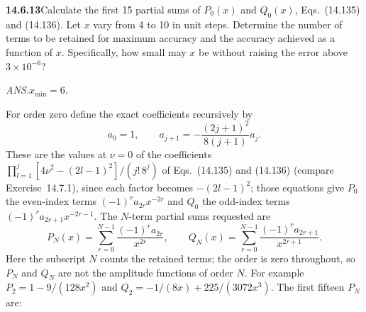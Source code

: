\par\bigskip
\noindent\textbf{14.6.13}\quad Calculate the first 15 partial sums of
$P_{0}(x)$ and $Q_{0}(x)$, Eqs.~(14.135) and (14.136). Let $x$ vary
from 4 to 10 in unit steps. Determine the number of terms to be
retained for maximum accuracy and the accuracy achieved as a function
of $x$. Specifically, how small may $x$ be without raising the error
above $3\times10^{-6}$?
\par\nobreak\hfill\emph{ANS.}\enspace$x_{\min}=6$.
\par{}
\solution
For order zero define the exact coefficients recursively by
\[
a_0=1,\qquad a_{j+1}=-\frac{(2j+1)^2}{8(j+1)}a_j.
\]
These are the values at $\nu=0$ of the coefficients
$\prod_{l=1}^j[4\nu^2-(2l-1)^2]/(j!\,8^j)$ of Eqs.~(14.135) and
(14.136) (compare Exercise~14.7.1), since each factor becomes
$-(2l-1)^2$; those equations give $P_0$ the even-index terms
$(-1)^ra_{2r}x^{-2r}$ and $Q_0$ the odd-index terms
$(-1)^ra_{2r+1}x^{-2r-1}$.
The $N$-term partial sums requested are
\[
P_N(x)=\sum_{r=0}^{N-1}\frac{(-1)^ra_{2r}}{x^{2r}},\qquad
Q_N(x)=\sum_{r=0}^{N-1}\frac{(-1)^ra_{2r+1}}{x^{2r+1}}.
\]
Here the subscript $N$ counts the retained terms; the order is
zero throughout, so $P_N$ and $Q_N$ are not the amplitude
functions of order $N$.
For example $P_2=1-9/(128x^2)$ and
$Q_2=-1/(8x)+225/(3072x^3)$. The first fifteen $P_N$ are:
